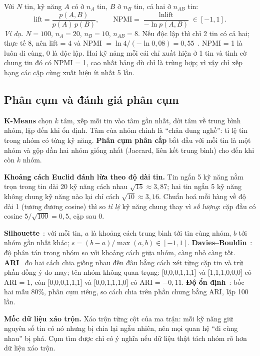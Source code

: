 \documentclass[12pt]{article}
\begin{document}
Với $N$ tin, kỹ năng $A$ có ở $n_A$ tin, $B$ ở $n_B$ tin, cả hai ở $n_{AB}$ tin:
\begin{equation}
\text{lift} = \frac{p(A,B)}{p(A)\,p(B)},\qquad
\text{NPMI} = \frac{\ln \text{lift}}{-\ln p(A,B)} \in [-1, 1].
\end{equation}
\textit{Ví dụ.} $N = 100$, $n_A = 20$, $n_B = 10$, $n_{AB} = 8$. Nếu độc lập thì chỉ 2 tin có cả hai; thực tế 8, nên lift = 4 và NPMI $= \ln 4 / (-\ln 0{,}08) = 0{,}55$~\cite{bouma2009npmi}. NPMI = 1 là luôn đi cùng, 0 là độc lập. Hai kỹ năng mỗi cái chỉ xuất hiện ở 1 tin và tình cờ chung tin đó có NPMI = 1, cao nhất bảng dù chỉ là trùng hợp; vì vậy chỉ xếp hạng các cặp cùng xuất hiện ít nhất 5 lần.

\subsection{Phân cụm và đánh giá phân cụm}
\label{sec:clustering}

\textbf{K-Means} chọn $k$ tâm, xếp mỗi tin vào tâm gần nhất, dời tâm về trung bình nhóm, lặp đến khi ổn định. Tâm của nhóm chính là ``chân dung nghề'': tỉ lệ tin trong nhóm có từng kỹ năng. \textbf{Phân cụm phân cấp} bắt đầu với mỗi tin là một nhóm và gộp dần hai nhóm giống nhất (Jaccard, liên kết trung bình) cho đến khi còn $k$ nhóm.

\textbf{Khoảng cách Euclid đánh lừa theo độ dài tin.} Tin ngắn 5 kỹ năng nằm trọn trong tin dài 20 kỹ năng cách nhau $\sqrt{15} \approx 3{,}87$; hai tin ngắn 5 kỹ năng không chung kỹ năng nào lại chỉ cách $\sqrt{10} \approx 3{,}16$. Chuẩn hoá mỗi hàng về độ dài 1 (tương đương cosine) thì so \textit{tỉ lệ} kỹ năng chung thay vì \textit{số lượng}: cặp đầu có cosine $5/\sqrt{100} = 0{,}5$, cặp sau 0.

\textbf{Silhouette}~\cite{rousseeuw1987silhouette}: với mỗi tin, $a$ là khoảng cách trung bình tới tin cùng nhóm, $b$ tới nhóm gần nhất khác; $s = (b - a)/\max(a, b) \in [-1, 1]$. \textbf{Davies--Bouldin}~\cite{davies1979db}: độ phân tán trong nhóm so với khoảng cách giữa nhóm, càng nhỏ càng tốt. \textbf{ARI}~\cite{hubert1985ari} đo hai cách chia giống nhau đến đâu bằng cách xét từng cặp tin và trừ phần đồng ý do may; tên nhóm không quan trọng: [0,0,0,1,1,1] và [1,1,1,0,0,0] có ARI = 1, còn [0,0,0,1,1,1] và [0,0,1,1,1,0] có ARI = $-0{,}11$. \textbf{Độ ổn định}~\cite{lange2004stability}: bốc hai mẫu 80\%, phân cụm riêng, so cách chia trên phần chung bằng ARI, lặp 100 lần.

\textbf{Mốc dữ liệu xáo trộn.} Xáo trộn từng cột của ma trận: mỗi kỹ năng giữ nguyên số tin có nó nhưng bị chia lại ngẫu nhiên, nên mọi quan hệ ``đi cùng nhau'' bị phá. Cụm tìm được chỉ có ý nghĩa nếu dữ liệu thật tách nhóm rõ hơn dữ liệu xáo trộn.
\end{document}

